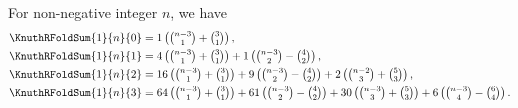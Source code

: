 \begin{example} For non-negative integer $n$, we have
  \begin{align*}
    \KnuthRFoldSum{1}{n}{0} &= 1  \left( \tbinom{n-3}{1}
    + \tbinom{3}{1}  \right), \\
    \KnuthRFoldSum{1}{n}{1} &= 4  \left( \tbinom{n-3}{1}
    + \tbinom{3}{1}  \right)  + 1  \left( \tbinom{n-3}{2}
    - \tbinom{4}{2}  \right), \\
    \KnuthRFoldSum{1}{n}{2} &= 16 \left( \tbinom{n-3}{1}
    + \tbinom{3}{1}  \right)  + 9  \left( \tbinom{n-3}{2}
    - \tbinom{4}{2}  \right)
    + 2  \left( \tbinom{n-2}{3} + \tbinom{5}{3}  \right), \\
    \KnuthRFoldSum{1}{n}{3} &= 64 \left( \tbinom{n-3}{1}
    + \tbinom{3}{1}  \right)  + 61 \left( \tbinom{n-3}{2}
    - \tbinom{4}{2}  \right)
    + 30 \left( \tbinom{n-3}{3} + \tbinom{5}{3}  \right)
    + 6 \left( \tbinom{n-3}{4} - \tbinom{6}{4}  \right).
  \end{align*}
\end{example}
